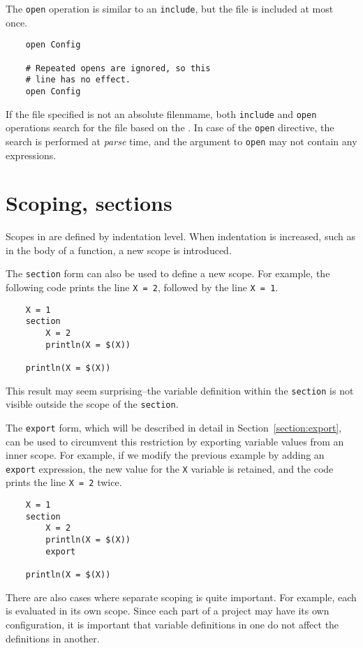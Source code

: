 The \verb+open+ operation is similar to an \verb+include+, but the file is included at most once.
\begin{verbatim}
    open Config

    # Repeated opens are ignored, so this
    # line has no effect.
    open Config
\end{verbatim}

If the file specified is not an absolute filenmame, both \verb+include+ and
\verb+open+ operations search for the file based on the
. In case of the \verb+open+ directive, the search is
performed at \emph{parse} time, and the argument to \verb+open+ may not
contain any expressions.

\section{Scoping, sections}
\label{section:section}

Scopes in  are defined by indentation level.  When indentation is
increased, such as in the body of a function, a new scope is introduced.

The \verb+section+ form can also be used to define a new scope.  For example, the following code
prints the line \verb+X = 2+, followed by the line \verb+X = 1+.

\begin{verbatim}
    X = 1
    section
        X = 2
        println(X = $(X))

    println(X = $(X))
\end{verbatim}

This result may seem surprising--the variable definition within the
\verb+section+ is not visible outside the scope of the \verb+section+.

The \verb+export+ form, which will be described in detail in
Section~\ref{section:export}, can be used to circumvent this restriction by
exporting variable values from an inner scope.
For example, if we modify the previous example
by adding an \verb+export+ expression, the new value for the \verb+X+
variable is retained, and the code prints the line \verb+X = 2+ twice.

\begin{verbatim}
    X = 1
    section
        X = 2
        println(X = $(X))
        export

    println(X = $(X))
\end{verbatim}

There are also cases where separate scoping is quite important.  For example,
each  is evaluated in its own scope.  Since each part of a project
may have its own configuration, it is important that variable definitions in one
 do not affect the definitions in another.

